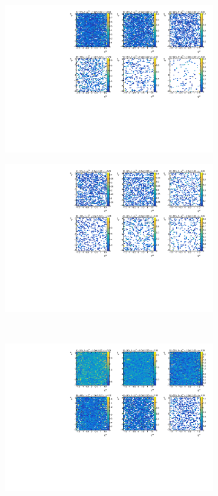 \begin{figure}
\begin{subfigure}{.5\textwidth}
\centering \includegraphics[width=1\textwidth]{figures/main/UE/eta_phi_map_trk2_dR0}
\caption{}
\end{subfigure} \quad
\begin{subfigure}{.5\textwidth}
\centering \includegraphics[width=1\textwidth]{figures/main/UE/eta_phi_map_trk6_dR0}
\caption{}
\end{subfigure} \\
\begin{subfigure}{.5\textwidth}
\centering \includegraphics[width=1\textwidth]{figures/main/UE/eta_phi_map_trk2_dR5}

\end{subfigure}
\end{figure}
